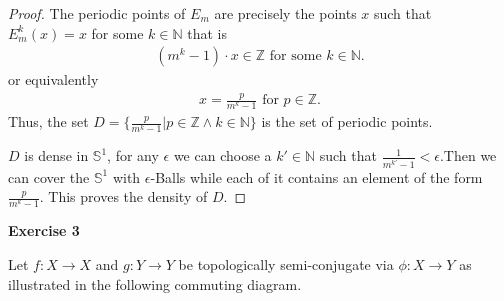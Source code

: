 \documentclass{article}
\newcommand{\N}{\mathbb{N}}
\newcommand{\Z}{\mathbb{Z}}
\renewcommand{\S}[1]{\mathbb{S}^{#1}}
\theoremstyle{definition}
\theoremstyle{plain}
\theoremstyle{remark}
\newcommand{\aufgabe}[1]{
	{
		\vspace*{0.5cm}
		\textsf{\textbf{Exercise #1}}
		\vspace*{0.2cm}

	}
}
\begin{document}
\begin{proof}
%

	The periodic points of $E_m$ are precisely the points $x$ such that $E_{m}^k(x) = x$ for some $k\in \N$ that is 
	\begin{align}
		(m^k-1) \cdot x \in \Z \text{ for some }k\in \N.
	\end{align}
	or equivalently
	\begin{align}
		x = \frac{p}{m^k-1} \text{ for }p\in\Z.
	\end{align}
Thus, the set $D=\{\frac{p}{m^k-1}|p\in \Z \wedge k\in \N\}$ is the set of periodic points.

$D$ is dense in $\S1$, for any $\epsilon$ we can choose a $k'\in \N$ such that $\frac{1}{m^{k'}-1}<\epsilon$.Then we can cover the $\S1$ with $\epsilon$-Balls while each of it contains an element of the form $\frac{p}{m^{k}-1}$.
This proves the density of $D$.
\end{proof}

\aufgabe3 Let $f:X\rightarrow X$ and $g:Y\rightarrow Y$ be topologically semi-conjugate via $\phi:X\rightarrow Y$ as illustrated in the following commuting diagram.
\begin{figure}[h]
	\centering
{}
\end{figure}
\end{document}
